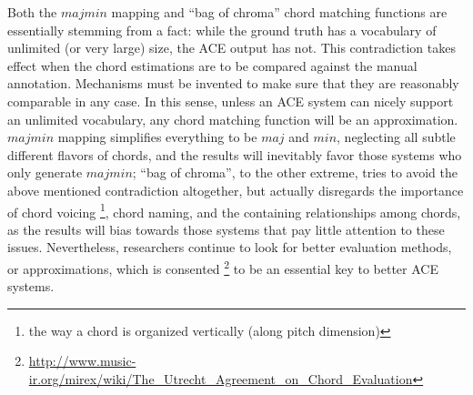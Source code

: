 Both the $majmin$ mapping and ``bag of chroma'' chord matching functions are essentially stemming from a fact: while the ground truth has a vocabulary of unlimited (or very large) size, the ACE output has not. This contradiction takes effect when the chord estimations are to be compared against the manual annotation. Mechanisms must be invented to make sure that they are reasonably comparable in any case. In this sense, unless an ACE system can nicely support an unlimited vocabulary, any chord matching function will be an approximation. $majmin$ mapping simplifies everything to be $maj$ and $min$, neglecting all subtle different flavors of chords, and the results will inevitably favor those systems who only generate $majmin$; ``bag of chroma'', to the other extreme, tries to avoid the above mentioned contradiction altogether, but actually disregards the importance of chord voicing \footnote{the way a chord is organized vertically (along pitch dimension)}, chord naming, and the containing relationships among chords, as the results will bias towards those systems that pay little attention to these issues. Nevertheless, researchers continue to look for better evaluation methods, or approximations, which is consented \footnote{\url{http://www.music-ir.org/mirex/wiki/The\_Utrecht\_Agreement\_on\_Chord\_Evaluation}} to be an essential key to better ACE systems.

